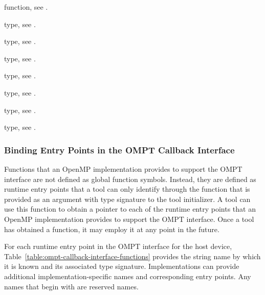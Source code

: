 \begin{crossrefs}
\item {} function, see .

\item {} type, see
  .

\item {} type, see .

\item {} type, 
see .

\item {} type, 
see .

\item {} type, 
see .

\item {} type, see .

\item {} type, see .
\end{crossrefs}



\subsubsection{Binding Entry Points in the OMPT Callback Interface}
\label{sec:ompt-bind}

Functions that an OpenMP implementation provides to support the OMPT 
interface are not defined as global function symbols. Instead, they are 
defined as runtime entry points that a tool can only identify through 
the  function that is provided as an argument with type 
signature  to the tool initializer. A tool 
can use this function to obtain a pointer to each of the runtime entry 
points that an OpenMP implementation provides to support the OMPT interface. 
Once a tool has obtained a  function, it may employ it at 
any point in the future.

For each runtime entry point in the OMPT interface for the host device,
Table~\ref{table:ompt-callback-interface-functions} provides the string
name by which it is known and its associated type signature. Implementations
can provide additional implementation-specific names and corresponding
entry points.  Any names that begin with  are reserved names.

